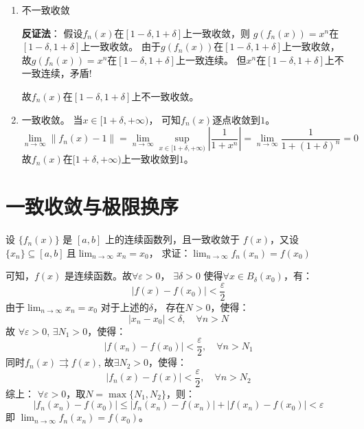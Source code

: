 \begin{solution}
\begin{enumerate}
        \item 不一致收敛

            \textbf{反证法}：
            假设\(f_{n}(x)\)在\([1-\delta,1+\delta]\)上一致收敛，则
            \(g(f_n(x))=x^{n}\)在\([1-\delta,1+\delta]\)上一致收敛。
            由于\(g(f_n(x))\)在\([1-\delta,1+\delta]\)上一致收敛，
            故\(g(f_n(x)) = x^{n}\)在\([1-\delta,1+\delta]\)上一致连续。
            但\(x^{n}\)在\([1-\delta,1+\delta]\)上不一致连续，矛盾!

            故\(f_{n}(x)\)在\([1-\delta,1+\delta]\)上不一致收敛。

        \item 一致收敛。
            当\(x \in [1+\delta,+\infty)\)，
            可知\(f_n(x)\)逐点收敛到\(1\)。%
            \[
                \lim_{n \to \infty} \left\lVert f_{n}(x) -
                1 \right\rVert
                = \lim_{n \to \infty} \sup_{x \in
                [1+\delta,+\infty)} \left\vert %
                \frac{1}{1 + x^{n}} \right\vert
                = \lim_{n \to \infty} \frac{1}{1+(1+\delta)^{n}} = 0
            \]
            故\(f_{n}(x)\)在\([1+\delta,+\infty)\)上一致收敛到\(1\)。%
    \end{enumerate}
\end{solution}

\section{一致收敛与极限换序}
\begin{problem}
    设 \(\{f_n(x)\}\) 是 \([a, b]\) 上的连续函数列，且一致收敛于 \(f(x)\)，又设\(\{x_n\}
    \subseteq [a, b] \ \)且\( \lim_{n \to \infty} x_n = x_0\)，
    求证：\(\lim_{n \to \infty} f_n(x_n) = f(x_0)\)
\end{problem}

\begin{solution}
    可知，\(f(x)\) 是连续函数。故\(\forall \varepsilon > 0\)，
    \(\exists \delta > 0\)
    使得\(\forall x \in B_{\delta}(x_{0})\)，有：
    \[
        \left| f(x)- f(x_{0}) \right| < \frac{\varepsilon}{2}
    \]
    由于\(\lim_{n \to \infty} x_{n}=x_{0}\) 对于上述的\(\delta\)，
    存在\(N>0\)，使得：
    \[
        \left| x_{n} - x_{0} \right| < \delta, \quad \forall n > N
    \]
    故 \(\forall \varepsilon > 0\), \(\exists N_1 > 0\)，使得：
    \[
        \left| f(x_{n})- f(x_{0}) \right| <
        \frac{\varepsilon}{2}, \quad
        \forall n > N_1
    \]
    同时\(f_{n}(x) \rightrightarrows f(x)\), 故\(\exists N_2 > 0\)，使得：
    \[
        \left| f_{n}(x) - f(x) \right| < \frac{\varepsilon}{2}, \quad
        \forall n > N_2
    \]
    综上： \(\forall \varepsilon > 0\)，取\(N = \max\{N_1, N_2\}\)，则：
    \[
        \left| f_{n}(x_{n}) - f(x_{0}) \right| \le \left|
        f_{n}(x_{n}) -
        f(x_{n}) \right| + \left| f(x_{n}) - f(x_{0})
        \right| < \varepsilon
    \]
    即 \(\lim_{n \to \infty} f_{n}(x_{n}) = f(x_{0})\)。
\end{solution}


